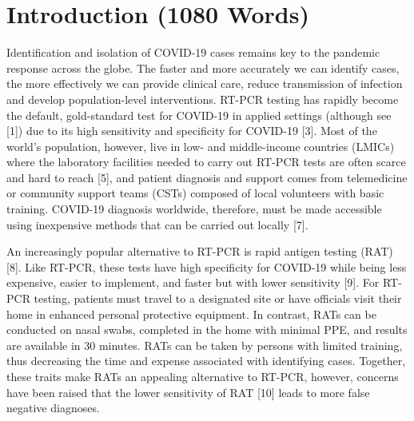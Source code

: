 \documentclass[]{elsarticle} %
\begin{document}
\hypertarget{introduction-1080-words}{%
\section{Introduction (1080 Words)}\label{introduction-1080-words}}

Identification and isolation of COVID-19 cases remains key to the pandemic response across the globe.
The faster and more accurately we can identify cases, the more effectively we can provide clinical care, reduce transmission of infection and develop population-level interventions.
RT-PCR testing has rapidly become the default, gold-standard test for COVID-19 in applied settings (although see {[}1{]}) due to its high sensitivity and specificity for COVID-19 {[}3{]}.
Most of the world's population, however, live in low- and middle-income countries (LMICs) where the laboratory facilities needed to carry out RT-PCR tests are often scarce and hard to reach {[}5{]}, and patient diagnosis and support comes from telemedicine or community support teams (CSTs) composed of local volunteers with basic training.
COVID-19 diagnosis worldwide, therefore, must be made accessible using inexpensive methods that can be carried out locally {[}7{]}.

An increasingly popular alternative to RT-PCR is rapid antigen testing (RAT) {[}8{]}.
Like RT-PCR, these tests have high specificity for COVID-19 while being less expensive, easier to implement, and faster but with lower sensitivity {[}9{]}.
For RT-PCR testing, patients must travel to a designated site or have officials visit their home in enhanced personal protective equipment.
In contrast, RATs can be conducted on nasal swabs, completed in the home with minimal PPE, and results are available in 30 minutes.
RATs can be taken by persons with limited training, thus decreasing the time and expense associated with identifying cases.
Together, these traits make RATs an appealing alternative to RT-PCR, however, concerns have been raised that the lower sensitivity of RAT {[}10{]} leads to more false negative diagnoses.
\end{document}
